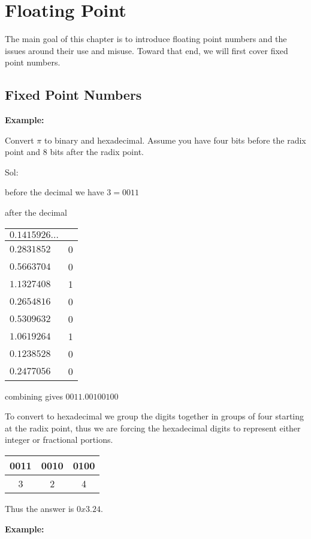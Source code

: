 \chapter{Floating Point}
\label{c-fp}


The main goal of this chapter is to introduce floating point numbers and the issues around their use and misuse.  Toward that end, we will first cover fixed point numbers.


\section{Fixed Point Numbers}


\vspace{.1in}\noindent
\textbf{Example:}


Convert $\pi$ to binary and hexadecimal.  Assume you have four
bits before the radix point and 8 bits after the radix point.

Sol:

before the decimal we have $3=0011$

after the decimal

\begin{tabular}{l|l}
$0.1415926\ldots$ & \\
\hline
$0.2831852$ & 0 \\
$0.5663704$ & 0 \\
$1.1327408$ & 1 \\
$0.2654816$ & 0 \\
$0.5309632$ & 0 \\
$1.0619264$ & 1 \\
$0.1238528$ & 0 \\
$0.2477056$ & 0 \\
\end{tabular}

combining gives $0011.00100100$

To convert to hexadecimal we group the digits together in groups of four starting at the radix point, thus we are forcing the hexadecimal digits to represent either integer or fractional portions.

\begin{tabular}{|c|c|c|}\hline
0011 & 0010 & 0100 \\ \hline
3    & 2    & 4    \\ \hline
\end{tabular}

Thus the answer is $0x3.24$.




\vspace{.1in}\noindent
\textbf{Example:}


